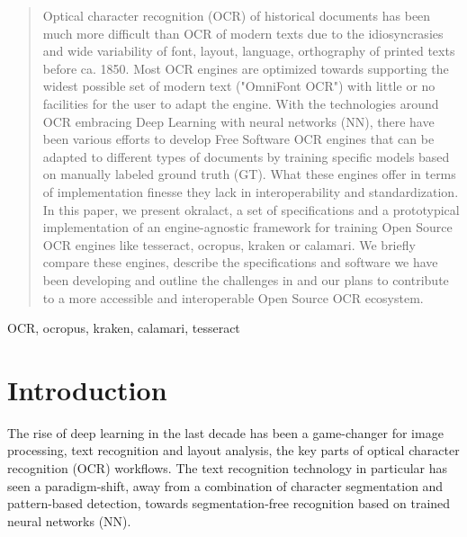 \documentclass[conference]{IEEEtran}
\begin{document}
\begin{abstract}

Optical character recognition (OCR) of historical documents has been much more
difficult than OCR of modern texts due to the idiosyncrasies and wide
variability of font, layout, language, orthography of printed texts before ca.
1850. Most OCR engines are optimized towards supporting the widest possible set
of modern text ("OmniFont OCR") with little or no facilities for the user to
adapt the engine. With the technologies around OCR embracing Deep Learning with
neural networks (NN), there have been various efforts to develop Free Software
OCR engines that can be adapted to different types of documents by training
specific models based on manually labeled ground truth (GT). What these
engines offer in terms of implementation finesse they lack in interoperability
and standardization. In this paper, we present okralact, a set of specifications
and a prototypical implementation of an engine-agnostic framework for training
Open Source OCR engines like tesseract, ocropus, kraken or calamari. We briefly
compare these engines, describe the specifications and software we have been
developing and outline the challenges in and our plans to contribute to
a more accessible and interoperable Open Source OCR ecosystem.

\end{abstract}

\begin{IEEEkeywords}
OCR, ocropus, kraken, calamari, tesseract
\end{IEEEkeywords}

\section*{Introduction}


The rise of deep learning in the last decade has been a game-changer for image
processing, text recognition and layout analysis, the key parts of optical
character recognition (OCR) workflows. The text recognition technology in
particular has seen a paradigm-shift, away from a combination of character
segmentation and pattern-based detection, towards segmentation-free recognition
based on trained neural networks (NN).
\end{document}
